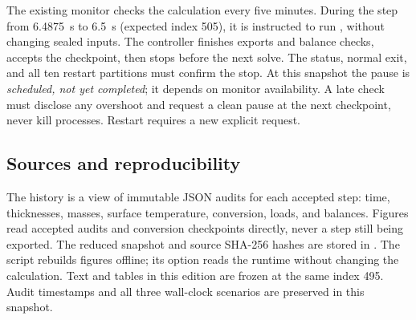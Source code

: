 The existing monitor checks the calculation every five minutes. During the
step from \SI{6.4875}{s} to \SI{6.5}{s} (expected index 505), it is instructed
to run , without changing sealed inputs. The controller
finishes exports and balance checks, accepts the checkpoint, then stops before
the next solve. The  status, normal exit, and all ten
restart partitions must confirm the stop. At this snapshot the pause is
\emph{scheduled, not yet completed}; it depends on monitor availability.
A late check must disclose any overshoot and request a clean pause at the
next checkpoint, never kill processes. Restart requires a new explicit request.

\subsection{Sources and reproducibility}
The  history is a view of immutable JSON audits
for each accepted step: time, thicknesses, masses, surface temperature,
conversion, loads, and balances. Figures read accepted audits and conversion
checkpoints directly, never a step still being exported. The reduced snapshot
and source SHA-256 hashes are stored in
. The
 script rebuilds figures offline; its
 option reads the runtime without changing the calculation.
Text and tables in this edition are frozen at the same index 495. Audit
timestamps and all three wall-clock scenarios are preserved in this snapshot.
\clearpage
